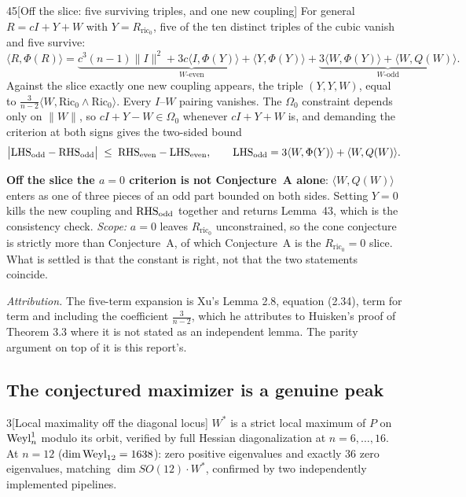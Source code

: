 \begin{Lem}{45}[Off the slice: five surviving triples, and one new coupling]
For general $R=cI+Y+W$ with $Y=R_{\mathrm{ric}_0}$, five of the ten distinct triples of the cubic vanish and five survive:
\[
\langle R,\Phi(R)\rangle=\underbrace{c^3(n-1)\|I\|^2+3c\langle I,\Phi(Y)\rangle+\langle Y,\Phi(Y)\rangle}_{W\text{-even}}
+\underbrace{3\langle W,\Phi(Y)\rangle+\langle W,Q(W)\rangle}_{W\text{-odd}} .
\]
Against the slice exactly one new coupling appears, the triple $(Y,Y,W)$, equal to $\tfrac3{n-2}\langle W,\mathrm{Ric}_0\wedge\mathrm{Ric}_0\rangle$. Every $I$--$W$ pairing vanishes. The $\Omega_0$ constraint depends only on $\|W\|$, so $cI+Y-W\in\Omega_0$ whenever $cI+Y+W$ is, and demanding the criterion at both signs gives the two-sided bound
\[
\big|\mathrm{LHS}_{\rm odd}-\mathrm{RHS}_{\rm odd}\big|\;\le\;\mathrm{RHS}_{\rm even}-\mathrm{LHS}_{\rm even},
\qquad \mathrm{LHS}_{\rm odd}=3\langle W,\Phi(Y)\rangle+\langle W,Q(W)\rangle .
\]
\end{Lem}

\noindent \textbf{Off the slice the $a=0$ criterion is not Conjecture~A alone}: $\langle W,Q(W)\rangle$ enters as one of three pieces of an odd part bounded on both sides. Setting $Y=0$ kills the new coupling and $\mathrm{RHS}_{\rm odd}$ together and returns Lemma~43, which is the consistency check. \emph{Scope:} $a=0$ leaves $R_{\mathrm{ric}_0}$ unconstrained, so the cone conjecture is strictly more than Conjecture~A, of which Conjecture~A is the $R_{\mathrm{ric}_0}=0$ slice. What is settled is that the constant is right, not that the two statements coincide.

\emph{Attribution.} The five-term expansion is Xu's Lemma 2.8, equation (2.34), term for term and including the coefficient $\tfrac3{n-2}$, which he attributes to Huisken's proof of Theorem 3.3 \cite{huisken1985} where it is not stated as an independent lemma. The parity argument on top of it is this report's.

\subsection{The conjectured maximizer is a genuine peak}

\begin{Obs}{3}[Local maximality off the diagonal locus]
$W^{*}$ is a strict local maximum of $P$ on $\mathrm{Weyl}^1_n$ modulo its orbit, verified by full Hessian diagonalization at $n=6,\dots,16$. At $n=12$ ($\dim\mathrm{Weyl}_{12}=1638$): zero positive eigenvalues and exactly $36$ zero eigenvalues, matching $\dim SO(12)\cdot W^{*}$, confirmed by two independently implemented pipelines.
\end{Obs}

